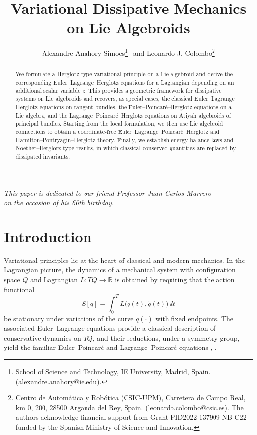 \documentclass[11pt,a4paper]{article}
\title{Variational Dissipative Mechanics on Lie Algebroids}
\author{Alexandre Anahory Simoes\thanks{School of Science and Technology, IE University, Madrid, Spain. (alexandre.anahory@ie.edu).} \, and Leonardo J. Colombo\thanks{Centro de Automática y Robótica (CSIC-UPM), Carretera de Campo Real, km 0, 200, 28500 Arganda del Rey, Spain. (leonardo.colombo@csic.es). The authors acknowledge financial support from Grant PID2022-137909-NB-C22 funded by the Spanish Ministry of Science and Innovation.}}
\date{\empty}
\theoremstyle{definition}
\begin{document}
\maketitle

\begin{center}
    \textit{This paper is dedicated to our friend Professor Juan Carlos Marrero\\ on the occasion of his 60th birthday.}
\end{center}

\begin{abstract}
We formulate a Herglotz-type variational principle on a Lie algebroid and derive the corresponding Euler--Lagrange--Herglotz equations for a Lagrangian  depending on an additional scalar variable $z$. 
This provides a geometric framework for dissipative systems on Lie algebroids
and recovers, as special cases, the classical Euler--Lagrange--Herglotz equations on tangent bundles, the Euler--Poincar\'e--Herglotz equations on a Lie algebra, and the 
Lagrange--Poincar\'e--Herglotz equations on Atiyah algebroids of principal bundles.
Starting from the local formulation, we then use Lie algebroid connections to obtain
a coordinate-free Euler--Lagrange--Poincar\'e--Herglotz and 
Hamilton--Pontryagin--Herglotz theory.
Finally, we establish energy balance laws and Noether--Herglotz-type results,
in which classical conserved quantities are replaced by dissipated invariants.
\end{abstract}


\section{Introduction}

Variational principles lie at the heart of classical and modern mechanics.
In the Lagrangian picture, the dynamics of a mechanical system with
configuration space $Q$ and Lagrangian $L \colon TQ \to \mathbb{R}$ is
obtained by requiring that the action functional
\[
S[q] = \int_0^T L\big(q(t),\dot q(t)\big)\,dt
\]
be stationary under variations of the curve $q(\cdot)$ with fixed endpoints.
The associated Euler--Lagrange equations provide a classical description of
conservative dynamics on $TQ$, and their reductions, under a symmetry group, yield the familiar
Euler--Poincar\'e and Lagrange--Poincar\'e equations \cite{holm1998euler}, \cite{cendra2001lagrangian}.
\end{document}
